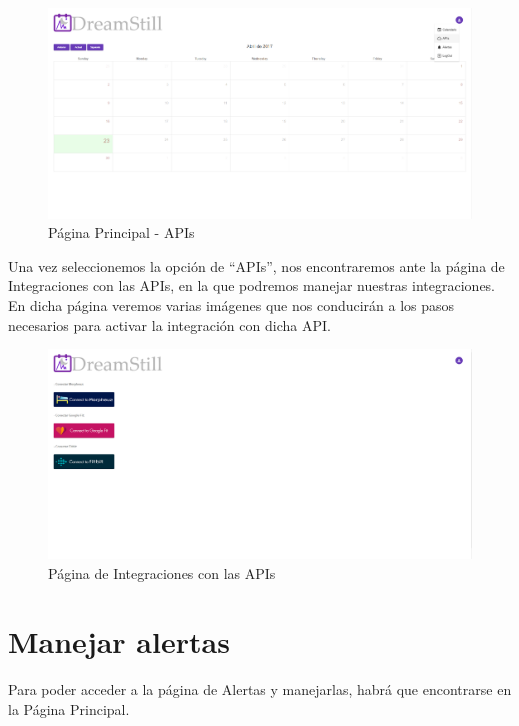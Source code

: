 \documentclass[11pt,openany]{book}
\begin{document}
\begin{figure}[H]
\centering
\includegraphics[totalheight=6cm]{manualUsuario/apis.png}
\caption{Página Principal - APIs}
\end{figure}

Una vez seleccionemos la opción de ``APIs'', nos encontraremos ante la página de Integraciones con las APIs, en la que podremos manejar nuestras integraciones. En dicha página veremos varias imágenes que nos conducirán a los pasos necesarios para activar la integración con dicha API.

\begin{figure}[H]
\centering
\includegraphics[totalheight=6cm]{manualUsuario/paginaApis.png}
\caption{Página de Integraciones con las APIs}
\end{figure}

\section{Manejar alertas}

Para poder acceder a la página de Alertas y manejarlas, habrá que encontrarse en la Página Principal.
\end{document}
